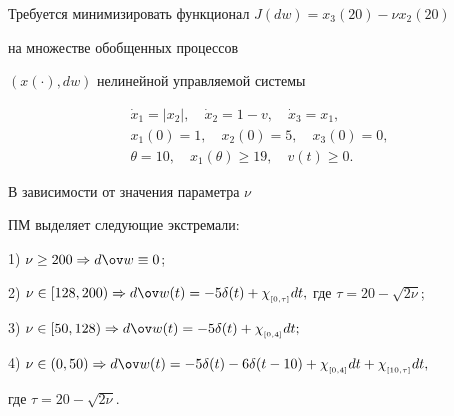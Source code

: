 







\begin{exam}


Требуется минимизировать функционал $J(d w)=x_3(20)-\nu x_2(20)$


на множестве обобщенных процессов


$(x(\cdot),d w)$ нелинейной управляемой системы


\begin{gather*}


\Dot


x_1=|x_2|,\quad \Dot x_2=1-v,\quad \Dot


x_3=x_1, \\


x_1(0)=1,\quad x_2(0)=5,\quad x_3(0)=0, \\


\theta = 10,\quad x_1(\theta)\geq 19,\quad v(t)\geq 0.


\end{gather*}





В зависимости от значения параметра $\nu$


ПМ выделяет следующие экстремали:





1) $\nu\geq 200\Rightarrow d\ov w\equiv 0$;








2) $\nu\in [128,200) \Rightarrow d\ov


w(t)=-5\delta(t)+\chi_{_{[0,\tau]}}dt,$ где $\tau=20-\sqrt{2\nu}$;





3) $\nu\in [50,128) \Rightarrow


d\ov w(t)=-5\delta(t)+\chi_{_{[0,4]}}dt;$





4) $\nu\in (0,50) \Rightarrow d\ov


w(t)=-5\delta(t)-6\delta(t-10)+\chi_{_{[0,4]}}dt+\chi_{_{[10,\tau]}}dt,$


где $\tau=20-\sqrt{2\nu}$.


\end{exam}





